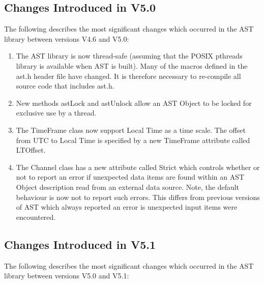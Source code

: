 \documentclass[twoside,11pt]{article}
\begin{document}
\subsection{Changes Introduced in V5.0}

The following describes the most significant changes which
occurred in the AST library between versions V4.6 and V5.0:

\begin{enumerate}


\item The AST library is now thread-safe (assuming that the POSIX pthreads
library is available when AST is built). Many of the macros defined in
the ast.h header file have changed. It is therefore necessary to
re-compile all source code that includes ast.h.

\item New methods astLock and astUnlock allow an AST Object to be locked
for exclusive use by a thread.

\item The TimeFrame class now support Local Time as a time scale. The offset
from UTC to Local Time is specified by a new TimeFrame attribute called
LTOffset.

\item The Channel class has a new attribute called Strict which controls
whether or not to report an error if unexpected data items are found
within an AST Object description read from an external data source. Note,
the default behaviour is now not to report such errors. This differs from
previous versions of AST which always reported an error is unexpected
input items were encountered.

\end{enumerate}

\subsection{Changes Introduced in V5.1}

The following describes the most significant changes which occurred in the
AST library between versions V5.0 and V5.1:
\end{document}
